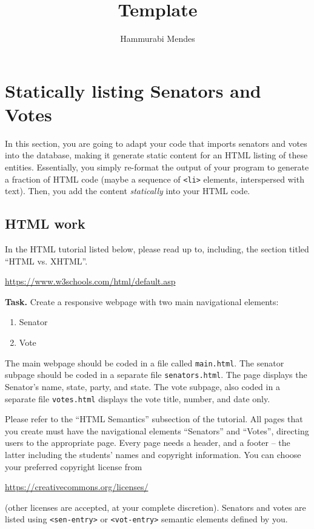 \documentclass[11pt]{article}
\title{Template}
\author{Hammurabi Mendes}
\begin{document}
\maketitle

\section{Statically listing Senators and Votes}

In this section, you are going to adapt your code that imports senators and votes into the database, making it generate static content for an HTML listing of these entities. Essentially, you simply re-format the output of your program to generate a fraction of HTML code (maybe a sequence of \texttt{<li>} elements, interspersed with text). Then, you add the content \emph{statically} into your HTML code.

\subsection{HTML work}

In the HTML tutorial listed below, please read up to, including, the section titled ``HTML vs. XHTML''.
%
\begin{center}
	\url{https://www.w3schools.com/html/default.asp}
\end{center}
%
\textbf{Task.} Create a responsive webpage with two main navigational elements:
\begin{enumerate}
	\item Senator
	\item Vote
\end{enumerate}
The main webpage should be coded in a file called \texttt{main.html}. The senator subpage should be coded in a separate file \texttt{senators.html}. The page displays the Senator's name, state, party, and state. The vote subpage, also coded in a separate file \texttt{votes.html} displays the vote title, number, and date only.

Please refer to the ``HTML Semantics'' subsection of the tutorial. All pages that you create must have the navigational elements ``Senators'' and ``Votes'', directing users to the appropriate page. Every page needs a header, and a footer -- the latter including the students' names and copyright information. You can choose your preferred copyright license from
%
\begin{center}
	\url{https://creativecommons.org/licenses/}
\end{center}
%
(other licenses are accepted, at your complete discretion). Senators and votes are listed using \texttt{<sen-entry>} or \texttt{<vot-entry>} semantic elements defined by you.
\end{document}
